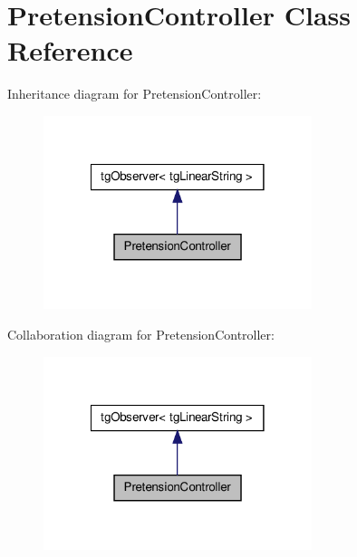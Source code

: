 \hypertarget{class_pretension_controller}{\section{Pretension\-Controller Class Reference}
\label{class_pretension_controller}
}


Inheritance diagram for Pretension\-Controller\-:\nopagebreak
\begin{figure}[H]
\begin{center}
\leavevmode
\includegraphics[width=222pt]{class_pretension_controller__inherit__graph}
\end{center}
\end{figure}


Collaboration diagram for Pretension\-Controller\-:\nopagebreak
\begin{figure}[H]
\begin{center}
\leavevmode
\includegraphics[width=222pt]{class_pretension_controller__coll__graph}
\end{center}
\end{figure}
